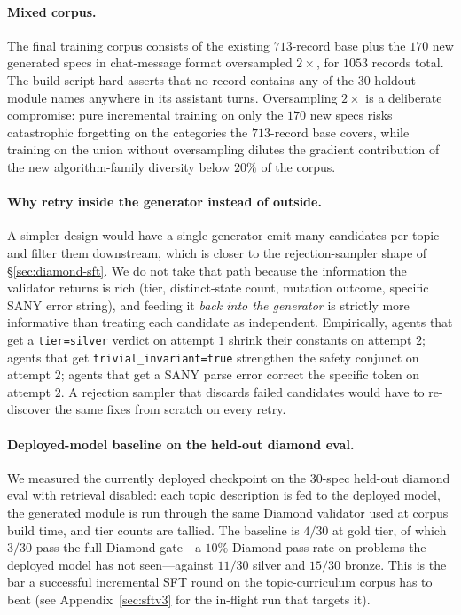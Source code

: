\documentclass[11pt]{article}
\begin{document}
\paragraph{Mixed corpus.} The final training corpus consists of the
existing $713$-record base plus the $170$ new generated specs in
chat-message format oversampled $2\!\times$, for $1053$ records total.
The build script hard-asserts that no record contains any of the
$30$ holdout module names anywhere in its assistant turns.
Oversampling $2\!\times$ is a deliberate compromise: pure incremental
training on only the $170$ new specs risks catastrophic forgetting on
the categories the $713$-record base covers, while training on the
union without oversampling dilutes the gradient contribution of the
new algorithm-family diversity below $20\%$ of the corpus.

\paragraph{Why retry inside the generator instead of outside.} A simpler
design would have a single generator emit many candidates per topic and
filter them downstream, which is closer to the rejection-sampler shape
of \S\ref{sec:diamond-sft}. We do not take that path because the
information the validator returns is rich (tier, distinct-state count,
mutation outcome, specific SANY error string), and feeding it
\emph{back into the generator} is strictly more informative than
treating each candidate as independent. Empirically, agents that get a
\texttt{tier=silver} verdict on attempt $1$ shrink their constants on
attempt $2$; agents that get \texttt{trivial\_invariant=true}
strengthen the safety conjunct on attempt $2$; agents that get a SANY
parse error correct the specific token on attempt $2$. A rejection
sampler that discards failed candidates would have to re-discover the
same fixes from scratch on every retry.

\paragraph{Deployed-model baseline on the held-out diamond eval.} We
measured the currently deployed checkpoint on the $30$-spec held-out
diamond eval with retrieval disabled: each topic description is fed to
the deployed model, the generated module is run through the same
Diamond validator used at corpus build time, and tier counts are
tallied. The baseline is $4/30$ at gold tier, of which $3/30$ pass the
full Diamond gate---a $10\%$ Diamond pass rate on problems the
deployed model has not seen---against $11/30$ silver and $15/30$
bronze. This is the bar a successful incremental SFT round on the
topic-curriculum corpus has to beat
(see Appendix~\ref{sec:sftv3} for the in-flight run that targets it).
\end{document}
